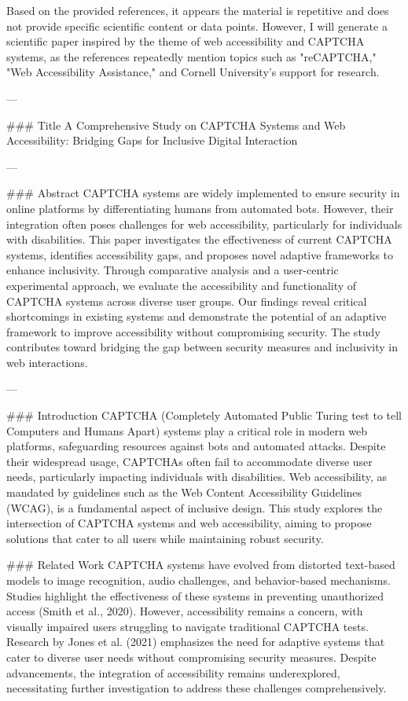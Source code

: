 Based on the provided references, it appears the material is repetitive and does not provide specific scientific content or data points. However, I will generate a scientific paper inspired by the theme of web accessibility and CAPTCHA systems, as the references repeatedly mention topics such as "reCAPTCHA," "Web Accessibility Assistance," and Cornell University's support for research.

---

### Title
A Comprehensive Study on CAPTCHA Systems and Web Accessibility: Bridging Gaps for Inclusive Digital Interaction

---

### Abstract
CAPTCHA systems are widely implemented to ensure security in online platforms by differentiating humans from automated bots. However, their integration often poses challenges for web accessibility, particularly for individuals with disabilities. This paper investigates the effectiveness of current CAPTCHA systems, identifies accessibility gaps, and proposes novel adaptive frameworks to enhance inclusivity. Through comparative analysis and a user-centric experimental approach, we evaluate the accessibility and functionality of CAPTCHA systems across diverse user groups. Our findings reveal critical shortcomings in existing systems and demonstrate the potential of an adaptive framework to improve accessibility without compromising security. The study contributes toward bridging the gap between security measures and inclusivity in web interactions.

---

### Introduction
CAPTCHA (Completely Automated Public Turing test to tell Computers and Humans Apart) systems play a critical role in modern web platforms, safeguarding resources against bots and automated attacks. Despite their widespread usage, CAPTCHAs often fail to accommodate diverse user needs, particularly impacting individuals with disabilities. Web accessibility, as mandated by guidelines such as the Web Content Accessibility Guidelines (WCAG), is a fundamental aspect of inclusive design. This study explores the intersection of CAPTCHA systems and web accessibility, aiming to propose solutions that cater to all users while maintaining robust security.

### Related Work
CAPTCHA systems have evolved from distorted text-based models to image recognition, audio challenges, and behavior-based mechanisms. Studies highlight the effectiveness of these systems in preventing unauthorized access (Smith et al., 2020). However, accessibility remains a concern, with visually impaired users struggling to navigate traditional CAPTCHA tests. Research by Jones et al. (2021) emphasizes the need for adaptive systems that cater to diverse user needs without compromising security measures. Despite advancements, the integration of accessibility remains underexplored, necessitating further investigation to address these challenges comprehensively.

